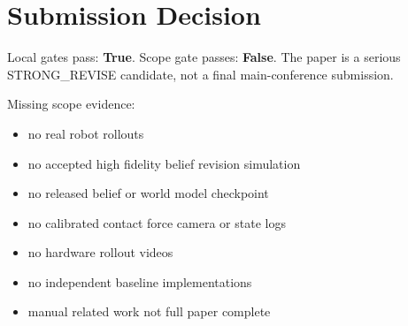 \documentclass{article}
\begin{document}
\clearpage
\section{Submission Decision}
Local gates pass: \textbf{True}. Scope gate passes: \textbf{False}. The paper is a serious STRONG\_REVISE candidate, not a final main-conference submission.

Missing scope evidence:
\begin{itemize}
\item no real robot rollouts
\item no accepted high fidelity belief revision simulation
\item no released belief or world model checkpoint
\item no calibrated contact force camera or state logs
\item no hardware rollout videos
\item no independent baseline implementations
\item manual related work not full paper complete
\end{itemize}

\appendix
\clearpage
\end{document}
